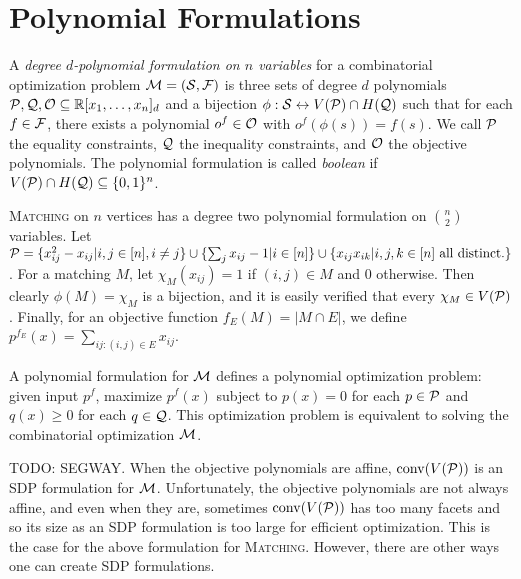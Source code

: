 \section{Polynomial Formulations}
\begin{definition}
A \emph{degree $d$-polynomial formulation on $n$ variables} for a combinatorial optimization problem $\mathcal M = (\mathcal S, \mathcal F)$ is three sets of degree $d$ polynomials $\mathcal P,\mathcal Q,\mathcal O \subseteq \mathbb R[x_1,\dots,x_n]_d$ and a bijection $\phi: \mathcal S \leftrightarrow V(\mathcal P) \cap H(\mathcal Q)$ such that for each $f \in \mathcal F$, there exists a polynomial $o^f \in \mathcal O$ with $o^f(\phi(s)) = f(s)$. We call $\mathcal P$ the equality constraints, $\mathcal Q$ the inequality constraints, and $\mathcal O$ the objective polynomials. The polynomial formulation is called \emph{boolean} if $V(\mathcal P) \cap H(\mathcal Q) \subseteq \{0,1\}^n$. 
\end{definition}
\begin{example}
\textsc{Matching} on $n$ vertices has a degree two polynomial formulation on $\binom{n}{2}$ variables. Let $\mathcal P = \{x_{ij}^2 - x_{ij} | i,j \in [n], i\neq j\} \cup \{\sum_j x_{ij} - 1 | i \in [n]\} \cup \{x_{ij}x_{ik} | i,j,k \in [n] \text{ all distinct.}\}$. For a matching $M$, let $\chi_M(x_{ij}) = 1$ if $(i,j) \in M$ and $0$ otherwise. Then clearly $\phi(M) = \chi_M$ is a bijection, and it is easily verified that every $\chi_M \in V(\mathcal P)$. Finally, for an objective function $f_E(M) = |M \cap E|$, we define $p^{f_E}(x) = \sum_{ij: (i,j) \in E} x_{ij}$. 
\end{example}
A polynomial formulation for $\mathcal M$ defines a polynomial optimization problem: given input $p^f$, maximize $p^f(x)$ subject to $p(x) = 0$ for each $p \in \mathcal P$ and $q(x) \geq 0$ for each $q \in \mathcal Q$. This optimization problem is equivalent to solving the combinatorial optimization $\mathcal M$. 

TODO: SEGWAY. When the objective polynomials are affine, $\operatorname{conv}(V(\mathcal P))$ is an SDP formulation for $\mathcal M$. Unfortunately, the objective polynomials are not always affine, and even when they are, sometimes $\operatorname{conv}(V(\mathcal P))$ has too many facets and so its size as an SDP formulation is too large for efficient optimization. This is the case for the above formulation for \textsc{Matching}. However, there are other ways one can create SDP formulations.

